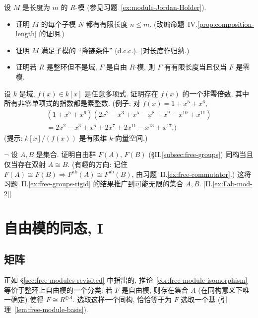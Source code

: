 \begin{prob}
\label{ex:length-submodule}
设 $M$ 是长度为 $m$ 的 $R$-模 (参见习题~\ref{ex:module-Jordan-Holder}).
\begin{itemize}
\item 证明 $M$ 的每个子模 $N$ 都有有限长度 $n\le m$. (改编命题~IV.\ref{prop:composition-length} 的证明.)
\item 证明 $M$ 满足子模的 ``降链条件'' (d.c.c.). (对长度作归纳.)
\item 证明若 $R$ 是整环但不是域, $F$ 是自由 $R$-模, 则 $F$ 有有限长度当且仅当 $F$ 是零模.
\end{itemize}
\end{prob}

\begin{prob}
\label{ex:prime-exponents}
设 $k$ 是域, $f(x)\in k[x]$ 是任意多项式. 证明存在 $f(x)$ 的一个非零倍数, 其中所有非零单项式的指数都是素整数. (例子: 对 $f(x)=1+x^5+x^6$,
\begin{multline*}
(1+x^5+x^6)(2x^2-x^3+x^5-x^8+x^9-x^{10}+x^{11}) \\
= 2x^2-x^3+x^5+2x^7+2x^{11}-x^{13}+x^{17}.)
\end{multline*}
(提示: $k[x]/(f(x))$ 是有限维 $k$-向量空间.)
\end{prob}

\begin{prob}
\label{ex:free-groups-isomorphic}
$\neg$ 设 $A,B$ 是集合. 证明自由群 $F(A)$, $F(B)$ (§II.\ref{subsec:free-groups}) 同构当且仅当存在双射 $A\cong B$. (有趣的方向: 记住 $F(A)\cong F(B) \Rightarrow F^{\mathrm{ab}}(A)\cong F^{\mathrm{ab}}(B)$, 由习题~II.\ref{ex:free-commutator}.) 这将习题~II.\ref{ex:free-groups-rigid} 的结果推广到可能无限的集合 $A,B$. [II.\ref{ex:Fab-mod-2}]
\end{prob}

\section{自由模的同态, I}
\label{sec:homomorphisms-free-modules-I}

\subsection{矩阵}
\label{subsec:matrices}

正如 §\ref{sec:free-modules-revisited} 中指出的, 推论~\ref{cor:free-module-isomorphism} 等价于整环上自由模的一个分类: 若 $F$ 是自由模, 则存在集合 $A$ (在同构意义下唯一确定) 使得 $F\cong R^{\oplus A}$. 选取这样一个同构, 恰恰等于为 $F$ 选取一个基 (引理~\ref{lem:free-module-basis}).


